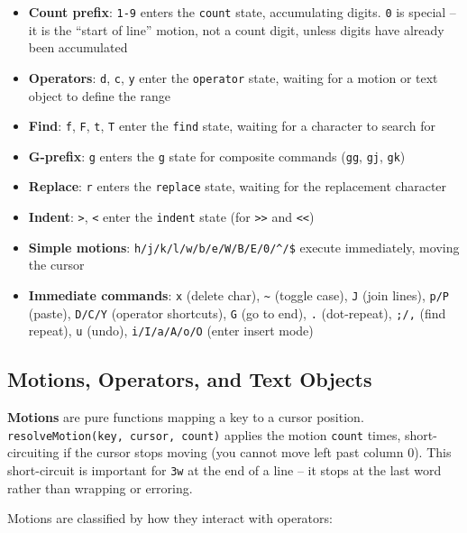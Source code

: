 \documentclass[
  english,
  11pt,
  letterpaper,
]{book}
\providecommand{\tightlist}{%
  \setlength{\itemsep}{0pt}\setlength{\parskip}{0pt}}
\begin{document}
\begin{itemize}
\tightlist
\item
  \textbf{Count prefix}: \texttt{1-9} enters the \texttt{count} state,
  accumulating digits. \texttt{0} is special -- it is the ``start of
  line'' motion, not a count digit, unless digits have already been
  accumulated
\item
  \textbf{Operators}: \texttt{d}, \texttt{c}, \texttt{y} enter the
  \texttt{operator} state, waiting for a motion or text object to define
  the range
\item
  \textbf{Find}: \texttt{f}, \texttt{F}, \texttt{t}, \texttt{T} enter
  the \texttt{find} state, waiting for a character to search for
\item
  \textbf{G-prefix}: \texttt{g} enters the \texttt{g} state for
  composite commands (\texttt{gg}, \texttt{gj}, \texttt{gk})
\item
  \textbf{Replace}: \texttt{r} enters the \texttt{replace} state,
  waiting for the replacement character
\item
  \textbf{Indent}: \texttt{\textgreater{}}, \texttt{\textless{}} enter
  the \texttt{indent} state (for \texttt{\textgreater{}\textgreater{}}
  and \texttt{\textless{}\textless{}})
\item
  \textbf{Simple motions}: \texttt{h/j/k/l/w/b/e/W/B/E/0/\^{}/\$}
  execute immediately, moving the cursor
\item
  \textbf{Immediate commands}: \texttt{x} (delete char),
  \texttt{\textasciitilde{}} (toggle case), \texttt{J} (join lines),
  \texttt{p/P} (paste), \texttt{D/C/Y} (operator shortcuts), \texttt{G}
  (go to end), \texttt{.} (dot-repeat), \texttt{;/,} (find repeat),
  \texttt{u} (undo), \texttt{i/I/a/A/o/O} (enter insert mode)
\end{itemize}

\subsection{Motions, Operators, and Text
Objects}\label{motions-operators-and-text-objects}

\textbf{Motions} are pure functions mapping a key to a cursor position.
\texttt{resolveMotion(key,\ cursor,\ count)} applies the motion
\texttt{count} times, short-circuiting if the cursor stops moving (you
cannot move left past column 0). This short-circuit is important for
\texttt{3w} at the end of a line -- it stops at the last word rather
than wrapping or erroring.

Motions are classified by how they interact with operators:
\end{document}
